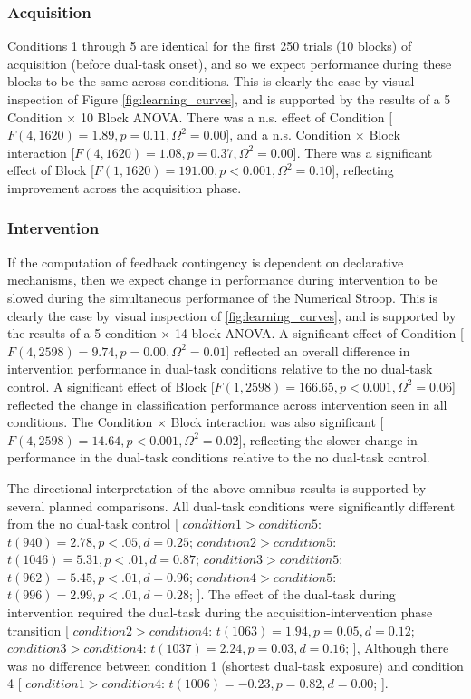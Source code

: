 \subsubsection*{Acquisition}
Conditions 1 through 5 are identical for the first 250 trials (10 blocks) of
acquisition (before dual-task onset), and so we expect performance during these
blocks to be the same across conditions. This is clearly the case by visual
inspection of Figure \ref{fig:learning_curves}, and is supported by the results
of a 5 Condition $\times$ 10 Block ANOVA. There was a n.s. effect of Condition
[$F(4,1620) = 1.89, p = 0.11, \Omega^2 = 0.00$], and a n.s. Condition $\times$ Block
interaction [$F(4,1620) = 1.08, p = 0.37, \Omega^2 = 0.00$]. There was a significant
effect of Block [$F(1,1620) = 191.00, p < 0.001, \Omega^2 = 0.10$], reflecting
improvement across the acquisition phase.

\subsubsection*{Intervention}
If the computation of feedback contingency is dependent on declarative
mechanisms, then we expect change in performance during intervention to be
slowed during the simultaneous performance of the Numerical Stroop. This is
clearly the case by visual inspection of \ref{fig:learning_curves}, and is
supported by the results of a 5 condition $\times$ 14 block ANOVA. A significant
effect of Condition [$F(4,2598) = 9.74, p = 0.00, \Omega^2 = 0.01$] reflected an
overall difference in intervention performance in dual-task conditions relative
to the no dual-task control. A significant effect of Block [$F(1,2598) = 166.65,
p < 0.001, \Omega^2 = 0.06$] reflected the change in classification performance
across intervention seen in all conditions. The Condition $\times$ Block
interaction was also significant [$F(4,2598) = 14.64, p < 0.001, \Omega^2 =
0.02$], reflecting the slower change in performance in the dual-task conditions
relative to the no dual-task control.

The directional interpretation of the above omnibus results is supported by
several planned comparisons. 
All dual-task conditions were significantly different from the no dual-task
control [
$condition  1 > condition  5$:
$t(940) = 2.78, p < .05, d = 0.25$;
$condition  2 > condition  5$:
$t(1046) = 5.31, p < .01, d = 0.87$;
$condition  3 > condition  5$:
$t(962) = 5.45, p < .01, d = 0.96$;
$condition  4 > condition  5$:
$t(996) = 2.99, p < .01, d = 0.28$;
].
The effect of the dual-task during intervention required the dual-task during
the acquisition-intervention phase transition [
$condition  2 > condition  4$:
$t(1063) = 1.94, p = 0.05, d = 0.12$;
$condition  3 > condition  4$:
$t(1037) = 2.24, p = 0.03, d = 0.16$;
],
Although there was no difference between condition 1 (shortest dual-task
exposure) and condition 4 [
$condition  1 > condition  4$:
$t(1006) = -0.23, p = 0.82, d = 0.00$;
].

